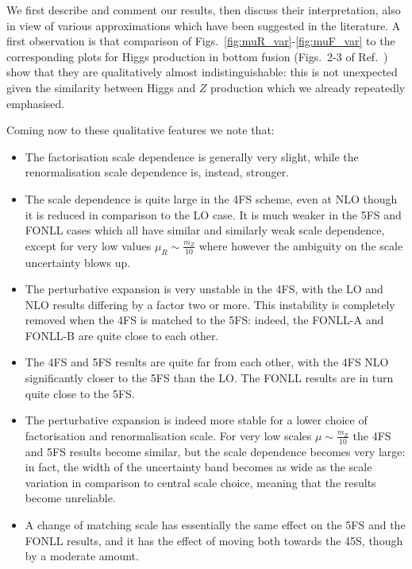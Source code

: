 \documentclass[12pt]{article}
\begin{document}




We first describe and comment our
results, then discuss their interpretation, also in view of various
approximations which have been suggested in the literature. A first observation is that  comparison of
Figs.~\ref{fig:muR_var}-\ref{fig:muF_var} to the corresponding
plots for Higgs production in bottom fusion (Figs.~2-3 of
Ref.~\cite{Forte:2016sja}) show that they are qualitatively almost
indistinguishable: this is not unexpected given the similarity between
Higgs and $Z$ production which we already repeatedly emphasised. 

Coming now to these qualitative features we note that:
\begin{itemize}
\item The factorisation scale dependence is generally very slight,
  while the renormalisation scale dependence is, instead, stronger.
\item The scale dependence is quite large in the 4FS scheme, even at
  NLO though it is reduced in comparison to the LO case. It is much
  weaker in the 5FS and FONLL cases which all have similar and
  similarly weak scale dependence, except for very low values
  $\mu_R\sim \frac{m_Z}{10}$ where however the ambiguity on the scale
  uncertainty blows up. 
\item The perturbative expansion is  very
  unstable in the 4FS, with the LO and NLO results differing by a
  factor two or more. This instability is completely removed when the
  4FS is matched to the 5FS: indeed, the FONLL-A and FONLL-B are quite
  close to each other.
\item The 4FS and 5FS results are quite far from each other, with
  the 4FS NLO significantly
  closer to the 5FS than the LO. The FONLL results are in turn quite close to the 5FS.
\item The perturbative expansion is indeed more stable for a lower
  choice of factorisation and renormalisation scale. For very low
  scales $\mu\sim\frac{m_Z}{10}$ the 4FS and 5FS results become
  similar, but the scale dependence becomes very large: in fact, the
  width of the uncertainty band becomes as wide as the scale variation
  in comparison to central scale choice, meaning that the results
  become unreliable.
\item A change of matching scale has essentially the same effect on
  the 5FS and the FONLL results, and it has the effect of moving both
  towards the 45S, though by a moderate amount.
\end{itemize}
\end{document}
